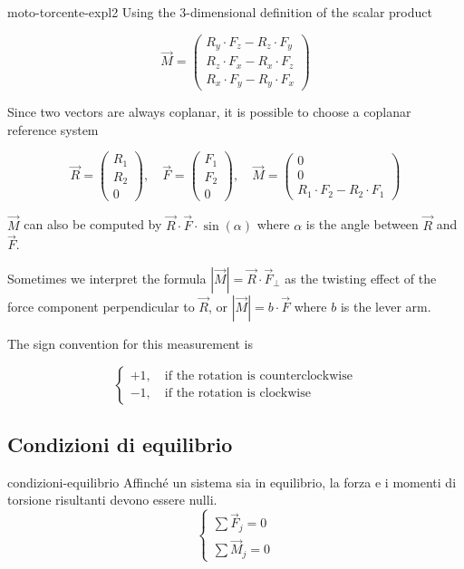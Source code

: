 \documentclass[preview]{standalone}
\begin{document}
\begin{snippet}{moto-torcente-expl2}
    Using the \(3\)-dimensional definition of the scalar product

    \[
        \vec{M}=
        \begin{pmatrix}
            R_y \cdot F_z - R_z \cdot F_y \\
            R_z \cdot F_x - R_x \cdot F_z \\
            R_x \cdot F_y - R_y \cdot F_x
        \end{pmatrix}
    \]

    Since two vectors are always coplanar, it is possible to choose a coplanar reference system

    \[
        \vec{R}=
        \begin{pmatrix}
            R_1 \\
            R_2 \\
            0
        \end{pmatrix}
        ,\quad
        \vec{F}=
        \begin{pmatrix}
            F_1 \\
            F_2 \\
            0
        \end{pmatrix}
        ,\quad
        \vec{M}=
        \begin{pmatrix}
            0 \\
            0 \\
            R_1 \cdot F_2 - R_2 \cdot F_1
        \end{pmatrix}
    \]

    \(\vec{M}\) can also be computed by \(\vec{R}\cdot\vec{F}\cdot\sin(\alpha)\) where \(\alpha\)
    is the angle between \(\vec{R}\) and \(\vec{F}\).

    Sometimes we interpret the formula \(|\vec{M}|=\vec{R}\cdot\vec{F}_\perp\) as
    the twisting effect of the force component perpendicular to \(\vec{R}\), or
    \(|\vec{M}|=b\cdot\vec{F}\) where \(b\) is the lever arm.

    The sign convention for this measurement is

    \[
        \begin{cases}
            +1, \quad \text{if the rotation is counterclockwise} \\
            -1, \quad \text{if the rotation is clockwise}
        \end{cases}
    \]
\end{snippet}

\subsection{Condizioni di equilibrio}

\begin{snippet}{condizioni-equilibrio}
    Affinché un sistema sia in equilibrio, la forza e i momenti di torsione risultanti devono essere nulli.
    \[
        \begin{cases}
            \sum \vec{F}_j=0 \\
            \sum \vec{M}_j=0
        \end{cases}
    \]
    \phantom{}
\end{snippet}
\end{document}
